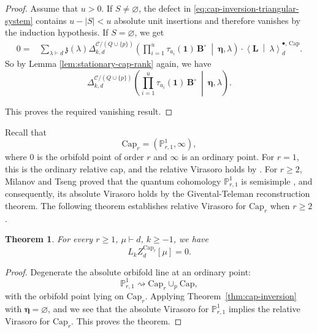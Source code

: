 \documentclass[letterpaper,12pt]{amsart}
\newtheorem{thm}{Theorem}[section]
\theoremstyle{definition}
\newcommand{\id}{\mathbf 1}
\newcommand{\PP}{\mathbb P}
\newcommand{\OrbCap}{\mathrm{Cap}}
\numberwithin{equation}{section}
\begin{document}
\begin{proof}
Assume that $u>0$. If \(S\neq\varnothing\), the defect in
\eqref{eq:cap-inversion-triangular-system} contains
\(u-|S|<u\) absolute unit insertions and therefore vanishes by the induction
hypothesis. If $S=\varnothing$, we get
\begin{equation*}
\begin{aligned}
0
={}&
\sum_{\lambda\vdash d}
\mathfrak z(\lambda)
\Delta_{k,d}^{\mathcal C/(Q\cup\{p\})}
\left(
\prod_{i=1}^u\tau_{a_i}(\id)\,
\mathbf B^\circ
\ \middle|\
\boldsymbol{\eta},\lambda
\right)\cdot
\left\langle
\mathbf L
\ \middle|\
\lambda
\right\rangle^{\bullet,\,\mathrm{Cap}}_d.
\end{aligned}
\end{equation*}
So by Lemma \ref{lem:stationary-cap-rank} again, we have
\[\Delta_{k,d}^{\mathcal C/(Q\cup\{p\})}
\left(
\prod_{i=1}^u\tau_{a_i}(\id)\,
\mathbf B^\circ
\ \middle|\
\boldsymbol{\eta},\lambda
\right).\]

This proves the required vanishing result.
\end{proof}


Recall that
\[
\OrbCap_r=(\PP^1_{r,1},\infty),
\]
where \(0\) is the orbifold point of order \(r\) and \(\infty\) is an
ordinary point.  For \(r=1\), this is the ordinary relative cap, and the relative Virasoro holds by \cite{OP3}.
For \(r\ge2\), Milanov and Tseng proved that the quantum cohomology $\PP^1_{r,1}$ is semisimple \cite{MT1}, and consequently, its absolute Virasoro holds by the Givental-Teleman reconstruction theorem. The following theorem establishes relative Virasoro for $\OrbCap_r$ when $r\ge2$.

\begin{thm}
\label{thm:orbifold-cap2}
For every \(r\ge1\), \(\mu\vdash d\), \(k\ge-1\), we have
\[
L_{k}Z^{\OrbCap_r}_d[\mu]=0.
\]
\end{thm}

\begin{proof}
Degenerate the absolute orbifold line at an ordinary point:
\[
\PP^1_{r,1}
\rightsquigarrow
\OrbCap_r\cup_p\mathrm{Cap},
\]
with the orbifold point lying on \(\OrbCap_r\). Applying Theorem~\ref{thm:cap-inversion} with $\boldsymbol{\eta}=\varnothing$, and we see that the absolute Virasoro for $\PP^1_{r,1}$ implies the relative Virasoro for $\OrbCap_r$. This proves the theorem.
\end{proof}


\end{document}

